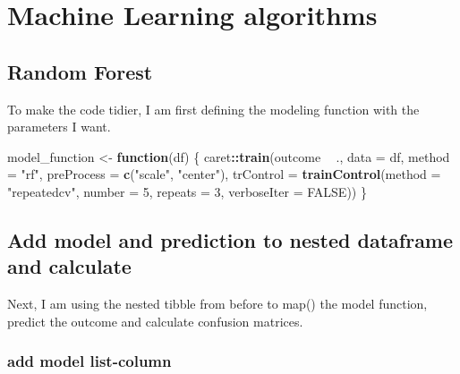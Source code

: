 \documentclass[]{book}
\newenvironment{Shaded}{\begin{snugshade}}{\end{snugshade}}
\newcommand{\ControlFlowTok}[1]{\textcolor[rgb]{0.13,0.29,0.53}{\textbf{#1}}}
\newcommand{\DataTypeTok}[1]{\textcolor[rgb]{0.13,0.29,0.53}{#1}}
\newcommand{\DecValTok}[1]{\textcolor[rgb]{0.00,0.00,0.81}{#1}}
\newcommand{\KeywordTok}[1]{\textcolor[rgb]{0.13,0.29,0.53}{\textbf{#1}}}
\newcommand{\NormalTok}[1]{#1}
\newcommand{\OperatorTok}[1]{\textcolor[rgb]{0.81,0.36,0.00}{\textbf{#1}}}
\newcommand{\OtherTok}[1]{\textcolor[rgb]{0.56,0.35,0.01}{#1}}
\newcommand{\StringTok}[1]{\textcolor[rgb]{0.31,0.60,0.02}{#1}}
\begin{document}
\hypertarget{machine-learning-algorithms}{%
\section{Machine Learning algorithms}\label{machine-learning-algorithms}}

\hypertarget{random-forest}{%
\subsection{Random Forest}\label{random-forest}}

To make the code tidier, I am first defining the modeling function with the parameters I want.

\begin{Shaded}
\begin{Highlighting}[]
\NormalTok{model_function <-}\StringTok{ }\ControlFlowTok{function}\NormalTok{(df) \{}
\NormalTok{  caret}\OperatorTok{::}\KeywordTok{train}\NormalTok{(outcome }\OperatorTok{~}\StringTok{ }\NormalTok{.,}
               \DataTypeTok{data =}\NormalTok{ df,}
               \DataTypeTok{method =} \StringTok{"rf"}\NormalTok{,}
               \DataTypeTok{preProcess =} \KeywordTok{c}\NormalTok{(}\StringTok{"scale"}\NormalTok{, }\StringTok{"center"}\NormalTok{),}
               \DataTypeTok{trControl =} \KeywordTok{trainControl}\NormalTok{(}\DataTypeTok{method =} \StringTok{"repeatedcv"}\NormalTok{, }
                                        \DataTypeTok{number =} \DecValTok{5}\NormalTok{, }
                                        \DataTypeTok{repeats =} \DecValTok{3}\NormalTok{, }
                                        \DataTypeTok{verboseIter =} \OtherTok{FALSE}\NormalTok{))}
\NormalTok{\}}
\end{Highlighting}
\end{Shaded}

\hypertarget{add-model-and-prediction-to-nested-dataframe-and-calculate}{%
\subsection{Add model and prediction to nested dataframe and calculate}\label{add-model-and-prediction-to-nested-dataframe-and-calculate}}

Next, I am using the nested tibble from before to map() the model function, predict the outcome and calculate confusion matrices.

\hypertarget{add-model-list-column}{%
\subsubsection{add model list-column}\label{add-model-list-column}}
\end{document}
